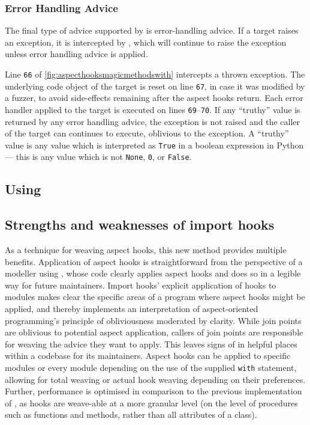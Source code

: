\subsubsection{Error Handling Advice}
The final type of advice supported by \pdsf{} is error-handling advice. If a
target raises an exception, it is intercepted by \pdsf{}, which will continue to
raise the exception unless error handling advice is applied. 

Line \texttt{66} of \cref{fig:aspecthooksmagicmethodswith} intercepts a thrown
exception. The underlying code object of the target is reset on line
\texttt{67}, in case it was modified by a fuzzer, to avoid side-effects
remaining after the aspect hooks return. Each error handler applied to the
target is executed on lines \texttt{69}--\texttt{70}. If any ``truthy'' value is
returned by any error handling advice, the exception is not raised and the
caller of the target can continues to execute, oblivious to the exception. A
``truthy'' value is any value which is interpreted as \lstinline{True} in a
boolean expression in Python --- this is any value which is not
\lstinline{None}, \lstinline{0}, or \lstinline{False}.


\subsection{Using \pdsf{}}



\subsection{Strengths and weaknesses of import hooks}\label{subsec:pdsf3importhooklimitations}


As a technique for weaving aspect hooks, this new method provides multiple
benefits. Application of aspect hooks is straightforward from the perspective of
a modeller using \pdsf{}, whose code clearly applies aspect hooks and does so in
a legible way for future maintainers. Import hooks' explicit application of
hooks to modules makes clear the specific areas of a program where aspect hooks
might be applied, and thereby implements an interpretation of aspect-oriented
programming's principle of obliviousness moderated by clarity. While join points
are oblivious to potential aspect application, callers of join points are
responsible for weaving the advice they want to apply. This leaves signs of
\aspectorientation{} in helpful places within a codebase for its maintainers.
Aspect hooks can be applied to specific modules or every module depending on the
use of the supplied \lstinline{with} statement, allowing for total weaving or
actual hook weaving depending on their preferences. Further, performance is
optimised in comparison to the previous implementation of \pdsf{}, as hooks are
weave-able at a more granular level (on the level of procedures such as
functions and methods, rather than all attributes of a class).

